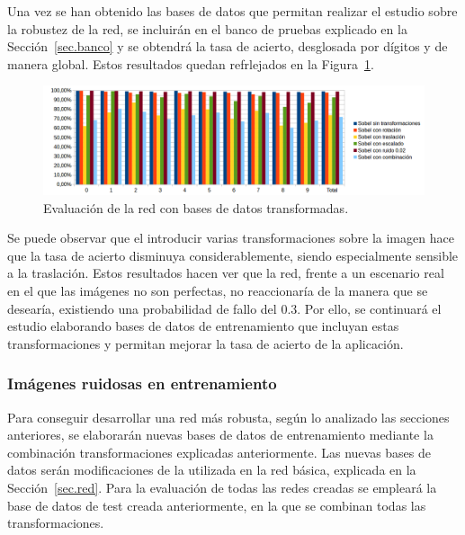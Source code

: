 Una vez se han obtenido las bases de datos que permitan realizar el estudio sobre la robustez de la red, se incluirán en el banco de pruebas explicado en la Sección~\ref{sec.banco} y se obtendrá la tasa de acierto, desglosada por dígitos y de manera global. Estos resultados quedan refrlejados en la Figura~\ref{fig.sobelEval}.

\begin{figure}[H]
	\begin{center}
		\includegraphics[width=1\textwidth]{figures/sobelev}
		\caption{Evaluación de la red con bases de datos transformadas.}
		\label{fig.sobelEval}
	\end{center}
\end{figure}
Se puede observar que el introducir varias transformaciones sobre la imagen hace que la tasa de acierto disminuya considerablemente, siendo especialmente sensible a la traslación. Estos resultados hacen ver que la red, frente a un escenario real en el que las imágenes no son perfectas, no reaccionaría de la manera que se desearía, existiendo una probabilidad de fallo del 0.3. Por ello, se continuará el estudio elaborando bases de datos de entrenamiento que incluyan estas transformaciones y permitan mejorar la tasa de acierto de la aplicación.

\subsubsection{Imágenes ruidosas en entrenamiento}
Para conseguir desarrollar una red más robusta, según lo analizado las secciones anteriores, se elaborarán nuevas bases de datos de entrenamiento mediante la combinación transformaciones explicadas anteriormente. Las nuevas bases de datos serán modificaciones de la utilizada en la red básica, explicada en la Sección~\ref{sec.red}. Para la evaluación de todas las redes creadas se empleará la base de datos de test creada anteriormente, en la que se combinan todas las transformaciones.\\


